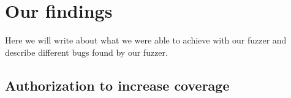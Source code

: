 \chapter{Our findings}
Here we will write about what we were able to achieve with our fuzzer and describe different bugs found by our fuzzer.

\section{Authorization to increase coverage}
